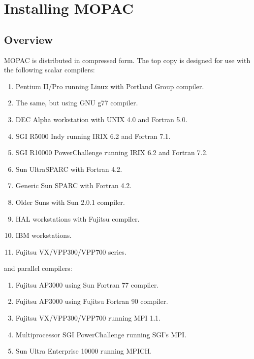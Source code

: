 \chapter{Installing MOPAC}
\section{Overview}
MOPAC is distributed in compressed form.  The top copy is designed 
for use with the following scalar compilers:
\begin{enumerate}
\item Pentium II/Pro running Linux with Portland Group compiler.
\item The same, but using GNU g77 compiler.
\item DEC Alpha workstation with UNIX 4.0 and Fortran 5.0.
\item SGI R5000 Indy running IRIX 6.2 and Fortran 7.1.
\item SGI R10000 PowerChallenge running IRIX 6.2 and Fortran 7.2.
\item Sun UltraSPARC with Fortran 4.2.
\item Generic Sun SPARC with Fortran 4.2.
\item Older Suns with Sun 2.0.1 compiler.
\item HAL workstations with Fujitsu compiler.
\item IBM workstations.  
\item Fujitsu VX/VPP300/VPP700 series. 
\end{enumerate}
and parallel compilers:
\begin{enumerate}
\item Fujitsu AP3000 using Sun Fortran 77 compiler.
\item Fujitsu AP3000 using Fujitsu Fortran 90 compiler.
\item Fujitsu VX/VPP300/VPP700 running MPI 1.1.
\item Multiprocessor SGI PowerChallenge running SGI's MPI.
\item Sun Ultra Enterprise 10000 running MPICH.
\end{enumerate}

